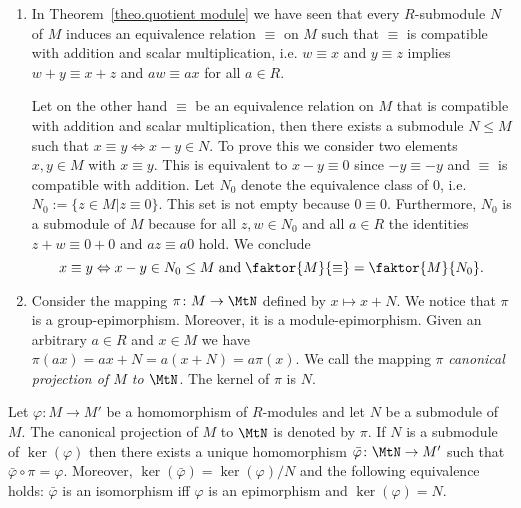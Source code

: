 \begin{rem}
\begin{enumerate}
\item In Theorem~\ref{theo.quotient module} we have seen that every $R$-submodule $N$ of $M$ induces an equivalence relation $\equiv$ on $M$  such that $\equiv$ is compatible with addition and scalar multiplication, i.e. $w\equiv x$ and $y\equiv z$ implies $w+y\equiv x+z$ and $aw\equiv ax$ for all $a\in R$. 

Let on the other hand $\equiv$ be an equivalence relation on $M$ that is compatible with addition and scalar multiplication, then there exists a submodule $N\leq M$ such that $x\equiv y\Leftrightarrow x-y\in N$. To prove this we consider two elements $x,y\in M$ with $x\equiv y$. This is equivalent to $x-y\equiv 0$ since $-y\equiv -y$ and $\equiv$ is compatible with addition. Let $N_0$ denote the equivalence class of 0, i.e. $N_0:=\lbrace z\in M|z\equiv 0\rbrace$. This set is not empty because $0\equiv 0$. Furthermore, $N_0$ is a submodule of $M$ because for all $z ,w\in N_0$ and all $a\in R$ the identities $z +w\equiv 0+0$ and $az\equiv a0$ hold. We conclude
\begin{equation*}
x\equiv y\Leftrightarrow x-y\in N_0\leq M \;\text{and}\; \faktor{M}{\equiv}=\faktor{M}{N_0}.
\end{equation*}
\item Consider the mapping $\pi\colon M\rightarrow \MtN$ defined by $x\mapsto x+N$. We notice that $\pi$ is a group-epimorphism. Moreover, it is a module-epimorphism. Given an arbitrary $a\in R$ and $x\in M$ we have $\pi(ax)=ax+N=a(x+N)=a\pi(x)$. We call the mapping $\pi$ \emph{canonical projection of $M$ to $\MtN$}. The kernel of $\pi$ is $N$.
\end{enumerate}
\end{rem}

\begin{theo}\label{theo.Universal Property}
Let $\varphi\colon M \to M'$ be a homomorphism of $R$-modules and let $N$ be a submodule of $M$. The canonical projection of $M$ to $\MtN$ is denoted by $\pi$. If $N$ is a submodule of $\ker(\varphi)$ then there exists a unique homomorphism $\bar{\varphi}\colon \MtN\rightarrow M'$ such that $\bar{\varphi}\circ\pi=\varphi$. Moreover, $\ker(\bar{\varphi})=\ker(\varphi)/N$ and the following equivalence holds: $\bar{\varphi}$ is an isomorphism iff $\varphi$ is an epimorphism and $\ker(\varphi)=N$.
\end{theo}

